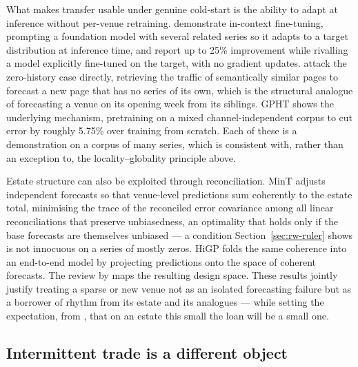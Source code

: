 What makes transfer usable under genuine cold-start is the ability to adapt at
inference without per-venue retraining. \citet{das_-context_2025} demonstrate
in-context fine-tuning, prompting a foundation model with several related
series so it adapts to a target distribution at inference time, and report up
to 25\% improvement while rivalling a model explicitly fine-tuned on the
target, with no gradient updates. \citet{zhou_context-driven_2025} attack the
zero-history case directly, retrieving the traffic of semantically similar
pages to forecast a new page that has no series of its own, which is the
structural analogue of forecasting a venue on its opening week from its
siblings. GPHT \citep{liu_generative_2024} shows the underlying mechanism,
pretraining on a mixed channel-independent corpus to cut error by roughly
5.75\% over training from scratch. Each of these is a demonstration on a corpus
of many series, which is consistent with, rather than an exception to, the
locality--globality principle above.

Estate structure can also be exploited through reconciliation. MinT
\citep{wickramasuriya_optimal_2019} adjusts independent forecasts so that
venue-level predictions sum coherently to the estate total, minimising the
trace of the reconciled error covariance among all linear reconciliations that
preserve unbiasedness, an optimality that holds only if the base forecasts are
themselves unbiased --- a condition Section~\ref{sec:rw-ruler} shows is not
innocuous on a series of mostly zeros. HiGP \citep{cini_graph-based_2024} folds
the same coherence into an end-to-end model by projecting predictions onto the
space of coherent forecasts. The review by
\citet{athanasopoulos_forecast_2024} maps the resulting design space. These
results jointly justify treating a sparse or new venue not as an isolated
forecasting failure but as a borrower of rhythm from its estate and its
analogues --- while setting the expectation, from
\citet{montero-manso_principles_2021}, that on an estate this small the loan
will be a small one.

\subsection*{Intermittent trade is a different object}


